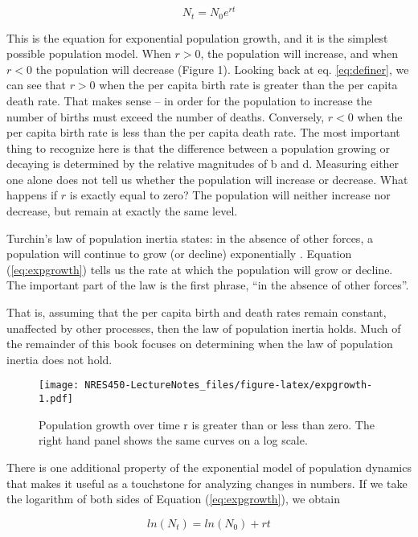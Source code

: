 \documentclass[]{book}
\begin{document}
\begin{equation}
N_t = N_0 e^{rt}
\label{eq:expgrowth}
\end{equation}

This is the equation for exponential population growth, and it is the
simplest possible population model. When \(r > 0\), the population will
increase, and when \(r < 0\) the population will decrease (Figure 1).
Looking back at eq. \eqref{eq:definer}, we can see that \(r > 0\) when the
per capita birth rate is greater than the per capita death rate. That
makes sense -- in order for the population to increase the number of
births must exceed the number of deaths. Conversely, \(r < 0\) when the
per capita birth rate is less than the per capita death rate. The most
important thing to recognize here is that the difference between a
population growing or decaying is determined by the relative magnitudes
of b and d. Measuring either one alone does not tell us whether the
population will increase or decrease. What happens if \(r\) is exactly
equal to zero? The population will neither increase nor decrease, but
remain at exactly the same level.

Turchin's law of population inertia states: in the absence of other
forces, a population will continue to grow (or decline) exponentially
\citep{turchin2003complex}. Equation (\eqref{eq:expgrowth}) tells us the
rate at which the population will grow or decline. The important part of
the law is the first phrase, ``in the absence of other forces''.

That is, assuming that the per capita birth and death rates remain
constant, unaffected by other processes, then the law of population
inertia holds. Much of the remainder of this book focuses on determining
when the law of population inertia does not hold.

\begin{figure}[htbp]
\centering
\texttt{[image: NRES450-LectureNotes\_files/figure-latex/expgrowth-1.pdf]}
\caption{\label{fig:expgrowth}Population growth over time r is greater than
or less than zero. The right hand panel shows the same curves on a log
scale.}
\end{figure}

There is one additional property of the exponential model of population
dynamics that makes it useful as a touchstone for analyzing changes in
numbers. If we take the logarithm of both sides of Equation
(\eqref{eq:expgrowth}), we obtain

\begin{equation*}
ln(N_t) = ln(N_0) + rt
\end{equation*}
\end{document}
